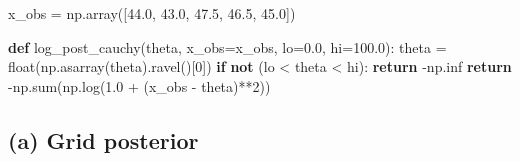 \documentclass[
  letterpaper,
  DIV=11,
  numbers=noendperiod]{scrartcl}
\newenvironment{Shaded}{\begin{snugshade}}{\end{snugshade}}
\newcommand{\BuiltInTok}[1]{\textcolor[rgb]{0.00,0.23,0.31}{#1}}
\newcommand{\ControlFlowTok}[1]{\textcolor[rgb]{0.00,0.23,0.31}{\textbf{#1}}}
\newcommand{\DecValTok}[1]{\textcolor[rgb]{0.68,0.00,0.00}{#1}}
\newcommand{\FloatTok}[1]{\textcolor[rgb]{0.68,0.00,0.00}{#1}}
\newcommand{\KeywordTok}[1]{\textcolor[rgb]{0.00,0.23,0.31}{\textbf{#1}}}
\newcommand{\NormalTok}[1]{\textcolor[rgb]{0.00,0.23,0.31}{#1}}
\newcommand{\OperatorTok}[1]{\textcolor[rgb]{0.37,0.37,0.37}{#1}}
\begin{document}
\begin{Shaded}
\begin{Highlighting}[]
\NormalTok{x\_obs }\OperatorTok{=}\NormalTok{ np.array([}\FloatTok{44.0}\NormalTok{, }\FloatTok{43.0}\NormalTok{, }\FloatTok{47.5}\NormalTok{, }\FloatTok{46.5}\NormalTok{, }\FloatTok{45.0}\NormalTok{])}

\KeywordTok{def}\NormalTok{ log\_post\_cauchy(theta, x\_obs}\OperatorTok{=}\NormalTok{x\_obs, lo}\OperatorTok{=}\FloatTok{0.0}\NormalTok{, hi}\OperatorTok{=}\FloatTok{100.0}\NormalTok{):}
\NormalTok{    theta }\OperatorTok{=} \BuiltInTok{float}\NormalTok{(np.asarray(theta).ravel()[}\DecValTok{0}\NormalTok{])}
    \ControlFlowTok{if} \KeywordTok{not}\NormalTok{ (lo }\OperatorTok{\textless{}}\NormalTok{ theta }\OperatorTok{\textless{}}\NormalTok{ hi):}
        \ControlFlowTok{return} \OperatorTok{{-}}\NormalTok{np.inf}
    \ControlFlowTok{return} \OperatorTok{{-}}\NormalTok{np.}\BuiltInTok{sum}\NormalTok{(np.log(}\FloatTok{1.0} \OperatorTok{+}\NormalTok{ (x\_obs }\OperatorTok{{-}}\NormalTok{ theta)}\OperatorTok{**}\DecValTok{2}\NormalTok{))}
\end{Highlighting}
\end{Shaded}

\subsection{(a) Grid posterior}\label{a-grid-posterior}
\end{document}
